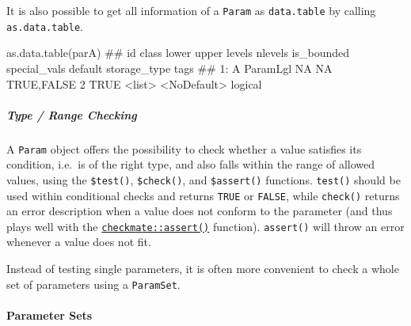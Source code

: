\documentclass[]{article}
\newenvironment{Shaded}{}{}
\newcommand{\KeywordTok}[1]{\textcolor[rgb]{0.00,0.00,1.00}{#1}}
\newcommand{\NormalTok}[1]{#1}
\newcommand{\OperatorTok}[1]{#1}
\newcommand{\OtherTok}[1]{\textcolor[rgb]{1.00,0.25,0.00}{#1}}
\newcommand{\StringTok}[1]{\textcolor[rgb]{0.00,0.50,0.50}{#1}}
\let\oldparagraph\paragraph
\renewcommand{\paragraph}[1]{\oldparagraph{#1}\mbox{}}
\let\oldsubparagraph\subparagraph
\renewcommand{\subparagraph}[1]{\oldsubparagraph{#1}\mbox{}}
\renewenvironment{Shaded} {\begin{snugshade}\small} {\end{snugshade}}
\begin{document}
It is also possible to get all information of a \texttt{Param} as \texttt{data.table} by calling \texttt{as.data.table}.

\begin{Shaded}
\begin{Highlighting}[]
\KeywordTok{as.data.table}\NormalTok{(parA)}
\NormalTok{##    id    class lower upper      levels nlevels is_bounded special_vals     default storage_type tags}
\NormalTok{## 1:  A ParamLgl    NA    NA  TRUE,FALSE       2       TRUE       <list> <NoDefault>      logical}
\end{Highlighting}
\end{Shaded}

\hypertarget{type-range-checking}{%
\subparagraph{Type / Range Checking}\label{type-range-checking}}

A \texttt{Param} object offers the possibility to check whether a value satisfies its condition, i.e.~is of the right type, and also falls within the range of allowed values, using the \texttt{\$test()}, \texttt{\$check()}, and \texttt{\$assert()} functions.
\texttt{test()} should be used within conditional checks and returns \texttt{TRUE} or \texttt{FALSE}, while \texttt{check()} returns an error description when a value does not conform to the parameter (and thus plays well with the \href{https://www.rdocumentation.org/packages/checkmate/topics/assert}{\texttt{checkmate::assert()}} function).
\texttt{assert()} will throw an error whenever a value does not fit.

\begin{Shaded}
\end{Shaded}

Instead of testing single parameters, it is often more convenient to check a whole set of parameters using a \texttt{ParamSet}.

\hypertarget{parameter-sets}{%
\paragraph{Parameter Sets}\label{parameter-sets}}
\end{document}
